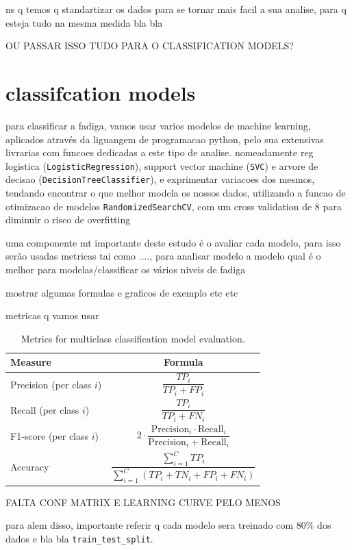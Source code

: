 \documentclass[conference]{IEEEtran}
\begin{document}
ns q temos q standartizar os dados para se tornar mais facil a sua analise, para q esteja tudo na mesma medida bla bla

OU PASSAR ISSO TUDO PARA O CLASSIFICATION MODELS?

\section{classifcation models}

para classificar a fadiga, vamos usar varios modelos de machine learning, aplicados através da liguangem de programacao python, pelo sua extensivas livrarias com funcoes dedicadas a este tipo de analise. nomeadamente reg logistica (\texttt{LogisticRegression}), support vector machine (\texttt{SVC}) e arvore de decisao (\texttt{DecisionTreeClassifier}), e exprimentar variacoes dos mesmos, tendando encontrar o que melhor modela os nossos dados, utilizando a funcao de otimizacao de modelos \texttt{RandomizedSearchCV}, com um cross validation de 8 para diminuir o risco de overfitting

uma componente mt importante deste estudo é o avaliar cada modelo, para isso serão usadas metricas tai como ...., para analisar modelo a modelo qual é o melhor para modelas/classificar os vários niveis de fadiga

mostrar algumas formulas e graficos de exemplo etc etc

metricas q vamos usar


\begin{table}[H]
\centering
\caption{Metrics for multiclass classification model evaluation.}
\label{evaluationmetrics}
\begin{tabular}{lc}
\toprule
Measure & Formula \\
\midrule
Precision (per class $i$) & $\dfrac{TP_i}{TP_i + FP_i}$ \\[1em]
Recall (per class $i$) & $\dfrac{TP_i}{TP_i + FN_i}$ \\[1em]
F1-score (per class $i$) & $2 \cdot \dfrac{\text{Precision}_i \cdot \text{Recall}_i}{\text{Precision}_i + \text{Recall}_i}$ \\[1em] 
Accuracy & $\dfrac{\sum_{i=1}^{C} TP_i}{\sum_{i=1}^{C} (TP_i + TN_i + FP_i + FN_i)}$ \\[1em]
\bottomrule
\end{tabular}
\end{table}

FALTA CONF MATRIX E LEARNING CURVE PELO MENOS

para alem disso, importante referir q cada modelo sera treinado com $80\%$ dos dados e bla bla \texttt{train\_test\_split}.
\end{document}
